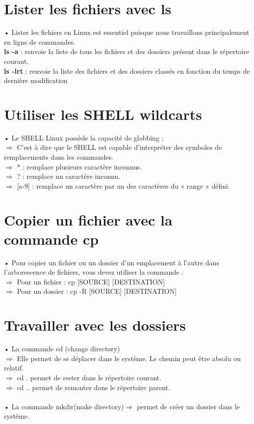 \documentclass[a4paper, 11pt, french, oneside]{book}
\begin{document}
\section{\Large Lister les fichiers avec ls} 
 
• Lister les fichiers en Linux est essentiel puisque nous travaillons principalement en ligne de commandes.\\
\textbf{ls -a} : renvoie la liste de tous les fichiers et des dossiers présent dans le
répertoire courant.\\
\textbf{ls -lrt} : renvoie la liste des fichiers et des dossiers classés en fonction du temps
de dernière modification
 
\section{\Large Utiliser les SHELL wildcarts} 
 
• Le SHELL Linux possède la capacité de globbing :\\
$\Rightarrow$ C’est à dire que le SHELL est capable d’interpréter des symboles de
remplacements dans les commandes.\\
$\Rightarrow$ * : remplace plusieurs caractère inconnus.\\
$\Rightarrow$ ? : remplace un caractère inconnu.\\
$\Rightarrow$ [a-9] : remplace un caractère par un des caractères du
« range » défini.
 
 
\section{\Large Copier un fichier avec la commande cp}  
 
• Pour copier un fichier ou un dossier d’un emplacement à l’autre dans l’arborescence de
fichiers, vous devez utiliser la commande :\\
$\Rightarrow$ Pour un fichier : cp [SOURCE] [DESTINATION]\\
$\Rightarrow$ Pour un dossier : cp -R [SOURCE] [DESTINATION]
 
\section{\Large Travailler avec les dossiers}

• La commande cd (change directory)\\
$\Rightarrow$ Elle permet de se déplacer dans le système. Le chemin peut être absolu ou relatif.\\
$\Rightarrow$ cd . permet de rester dans le répertoire courant.\\
$\Rightarrow$ cd .. permet de remonter dans le répertoire parent.\\\\
• La commande mkdir(make directory)$\Rightarrow$ permet de créer un dossier dans le système.\\
\end{document}
